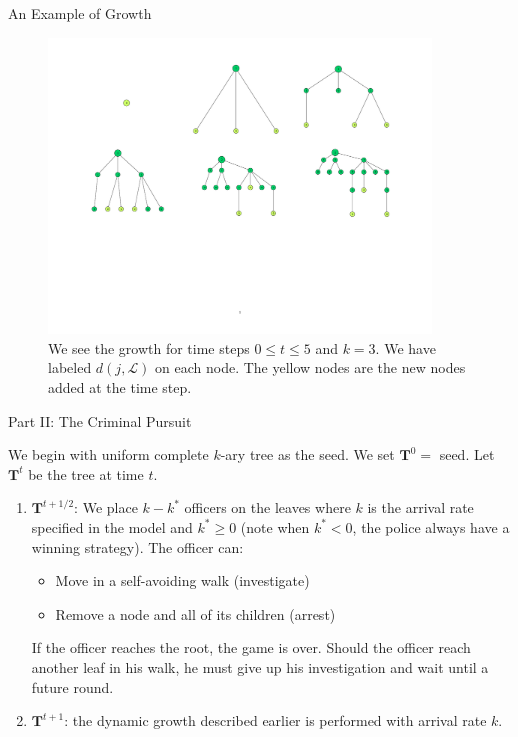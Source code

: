 \documentclass[xcolor=dvipsnames]{beamer}
\newcommand{\bb}[1]{\textbf{#1}}
\begin{document}
\begin{frame}{An Example of Growth}
\begin{figure}
\includegraphics[width = 4in]{GrowthPic.pdf}
\caption{We see the growth for time steps $0 \leq t \leq 5$ and $k= 3$.  We have labeled $d(j, \mathcal L)$ on each node.  The yellow nodes are the new nodes added at the time step.}
\end{figure}
\end{frame}

\begin{frame}{Part II: The Criminal Pursuit}

We begin with uniform complete $k$-ary tree as the seed. We set $\bb T^0=$ seed.  Let $\bb T^{t}$ be the tree at time $t$.

\begin{enumerate}
\item $\bb T^{t+1/2}$:  We place $k-k^*$ officers on the leaves where $k$ is the arrival rate specified in the model and $k^* \geq 0$ (note when $k^* < 0$, the police always have a winning strategy).  The officer can:
\begin{itemize}
\item Move in a self-avoiding walk (investigate)
\item Remove a node and all of its children (arrest)
\end{itemize}
If the officer reaches the root, the game is over.  Should the officer reach another leaf in his walk, he must give up his investigation and wait until a future round.
\item  $\bb T^{t+1}$: the dynamic growth described earlier is performed with arrival rate $k$.
\end{enumerate}

\end{frame}
\end{document}
